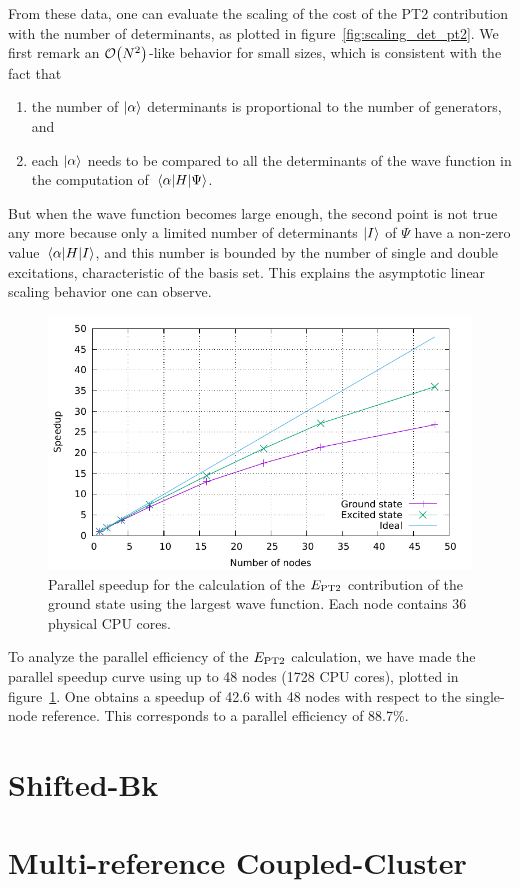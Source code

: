 \documentclass[./thesis.tex]{subfiles}
\begin{document}
From these data, one can evaluate the scaling of the cost of the PT2 contribution
with the number of determinants, as plotted in figure~\ref{fig:scaling_det_pt2}.
We first remark an $\order{N^2}$-like behavior for small sizes, which is consistent
with the fact that
\begin{enumerate}
\item the number of $\ket{\alpha}$ determinants is proportional to the
number of generators, and 
\item each $\ket{\alpha}$ needs to be compared to all the determinants of the wave function in the computation of $\mel{\alpha}{H}{\Psi}$.
\end{enumerate}
But when the wave function becomes large enough, the second point is not true any more because only a limited number of determinants $\ket{I}$ of $\Psi$ have a non-zero
value $\mel{\alpha}{H}{I}$, and this number is bounded by the number of single and double excitations, characteristic of the basis set. This explains the asymptotic linear scaling behavior one can observe.
\begin{figure}[h]
	\begin{center}
		\includegraphics[width=0.8\columnwidth]{figures/pt2/scaling_node}
		\caption{Parallel speedup for the calculation of the $E_\text{PT2}$ contribution of the ground state using the largest wave function. Each node contains 36 physical CPU cores.}
		\label{fig:scaling_node_pt2}
	\end{center}
\end{figure}

To analyze the parallel efficiency of the $E_\text{PT2}$ calculation, we have made the parallel speedup curve using up to 48 nodes (1728 CPU cores), plotted in figure~\ref{fig:scaling_node_pt2}. One obtains a speedup of 42.6 with 48 nodes with respect to the single-node reference. This corresponds to a parallel efficiency of 88.7\%.

\section{Shifted-Bk}

\section{Multi-reference Coupled-Cluster}
\end{document}
